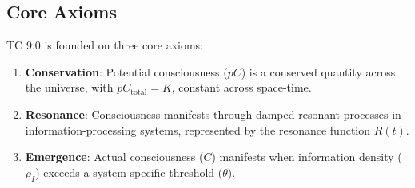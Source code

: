 \documentclass[12pt]{article}
\begin{document}
\subsection{Core Axioms}
TC 9.0 is founded on three core axioms:

\begin{enumerate}
    \item \textbf{Conservation}: Potential consciousness ($pC$) is a conserved quantity across the universe, with $pC_{\text{total}} = K$, constant across space-time.
    
    \item \textbf{Resonance}: Consciousness manifests through damped resonant processes in information-processing systems, represented by the resonance function $R(t)$.
    
    \item \textbf{Emergence}: Actual consciousness ($C$) manifests when information density ($\rho_I$) exceeds a system-specific threshold ($\theta$).
\end{enumerate}
\end{document}
